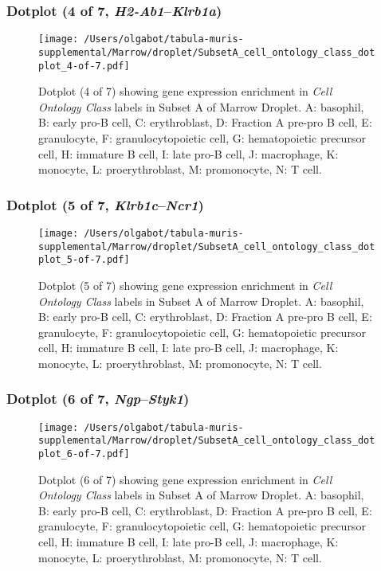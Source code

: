 \clearpage

\subsubsection{Dotplot (4 of 7, \emph{H2-Ab1}--\emph{Klrb1a})}
\begin{figure}[h]
\centering
\texttt{[image: /Users/olgabot/tabula-muris-supplemental/Marrow/droplet/SubsetA\_cell\_ontology\_class\_dotplot\_4-of-7.pdf]}

\caption{ Dotplot (4 of 7)  showing gene expression enrichment in \emph{Cell Ontology Class} labels in Subset A of Marrow Droplet. A: basophil, B: early pro-B cell, C: erythroblast, D: Fraction A pre-pro B cell, E: granulocyte, F: granulocytopoietic cell, G: hematopoietic precursor cell, H: immature B cell, I: late pro-B cell, J: macrophage, K: monocyte, L: proerythroblast, M: promonocyte, N: T cell.}
\end{figure}


\clearpage

\subsubsection{Dotplot (5 of 7, \emph{Klrb1c}--\emph{Ncr1})}
\begin{figure}[h]
\centering
\texttt{[image: /Users/olgabot/tabula-muris-supplemental/Marrow/droplet/SubsetA\_cell\_ontology\_class\_dotplot\_5-of-7.pdf]}

\caption{ Dotplot (5 of 7)  showing gene expression enrichment in \emph{Cell Ontology Class} labels in Subset A of Marrow Droplet. A: basophil, B: early pro-B cell, C: erythroblast, D: Fraction A pre-pro B cell, E: granulocyte, F: granulocytopoietic cell, G: hematopoietic precursor cell, H: immature B cell, I: late pro-B cell, J: macrophage, K: monocyte, L: proerythroblast, M: promonocyte, N: T cell.}
\end{figure}


\clearpage

\subsubsection{Dotplot (6 of 7, \emph{Ngp}--\emph{Styk1})}
\begin{figure}[h]
\centering
\texttt{[image: /Users/olgabot/tabula-muris-supplemental/Marrow/droplet/SubsetA\_cell\_ontology\_class\_dotplot\_6-of-7.pdf]}

\caption{ Dotplot (6 of 7)  showing gene expression enrichment in \emph{Cell Ontology Class} labels in Subset A of Marrow Droplet. A: basophil, B: early pro-B cell, C: erythroblast, D: Fraction A pre-pro B cell, E: granulocyte, F: granulocytopoietic cell, G: hematopoietic precursor cell, H: immature B cell, I: late pro-B cell, J: macrophage, K: monocyte, L: proerythroblast, M: promonocyte, N: T cell.}
\end{figure}


